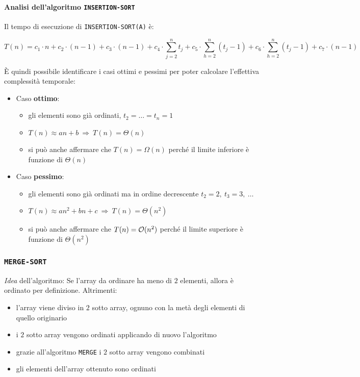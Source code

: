 \documentclass[italian, 10pt]{article}
\begin{document}
\paragraph{Analisi dell'algoritmo \texttt{INSERTION-SORT}}

Il tempo di esecuzione di \texttt{INSERTION-SORT(A)} è:

\[ T(n) = c_1 \cdot n + c_2 \cdot (n-1) + c_3 \cdot (n-1) + c_4 \cdot \displaystyle \sum_{j=2}^n t_j + c_5 \cdot \displaystyle \sum_{h=2}^n (t_j - 1) + c_6 \cdot \displaystyle \sum_{h=2}^n (t_j - 1) + c_7 \cdot (n-1) \]

È quindi possibile identificare i casi ottimi e pessimi per poter calcolare l'effettiva complessità temporale:

\begin{itemize}
  \item Caso \textbf{ottimo}:
        \begin{itemize}
          \item gli elementi sono già ordinati, \(t_2 = \ldots = t_n = 1\)
          \item \(T(n) \approx an + b \ \Rightarrow \  T(n) = \Theta(n)\)
          \item si può anche affermare che \(T(n) = \Omega(n)\) perché il limite inferiore è funzione di \(\Theta(n)\)
        \end{itemize}
  \item Caso \textbf{pessimo}:
        \begin{itemize}
          \item gli elementi sono già ordinati ma in ordine decrescente \(t_2 = 2,\ t_3 = 3,\ \ldots\)
          \item \(T(n) \approx an^2 + bn + c \ \Rightarrow \ T(n) = \Theta(n^2)\)
          \item si può anche affermare che \(T(n) = \mathcal{O}(n^2)\) perché il limite superiore è funzione di \(\Theta(n^2)\)
        \end{itemize}
\end{itemize}

\subsubsection{\texttt{MERGE-SORT}}

\textit{Idea} dell'algoritmo:
Se l'array da ordinare ha meno di \(2\) elementi, allora è ordinato per definizione.
Altrimenti:
\begin{itemize}
  \item l'array viene diviso in \(2\) sotto array, ognuno con la metà degli elementi di quello originario
  \item i \(2\) sotto array vengono ordinati applicando di nuovo l'algoritmo
  \item grazie all'algoritmo \texttt{MERGE} i \(2\) sotto array vengono combinati
  \item gli elementi dell'array ottenuto sono ordinati
\end{itemize}
\end{document}
